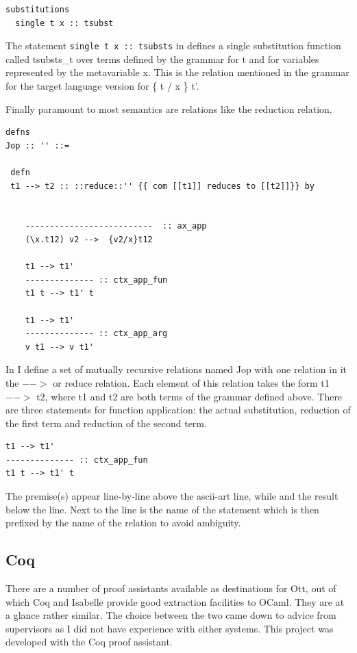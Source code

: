 \documentclass[12pt,twoside,notitlepage]{report}
\begin{document}
\begin{minipage}{\linewidth}
\begin{lstlisting}[language={Ott}, caption={Ott substitution example}, label={lst:ottsubstex}]
substitutions
  single t x :: tsubst 
\end{lstlisting}
\end{minipage}


The statement \lstinline[language={Ott}]|single t x :: tsubsts| in  defines a single substitution function called tsubsts\_t over terms defined by the grammar for t and for variables represented by the metavariable x. This is the relation mentioned in the grammar for the target language version for \{ t / x \} t'.



Finally paramount to most semantics are relations like the reduction relation.
\begin{lstlisting}[language={Ott}, caption={Ott reduction relation example}, label={lst:ottredex}]
defns
Jop :: '' ::=

 defn
 t1 --> t2 :: ::reduce::'' {{ com [[t1]] reduces to [[t2]]}} by


    --------------------------  :: ax_app
    (\x.t12) v2 -->  {v2/x}t12

    t1 --> t1'
    -------------- :: ctx_app_fun
    t1 t --> t1' t

    t1 --> t1'
    -------------- :: ctx_app_arg
    v t1 --> v t1'
\end{lstlisting}
In  I define a set of mutually recursive relations named Jop with one relation in it the $-->$ or reduce relation. Each element of this relation takes the form t1 $-->$ t2, where t1 and t2 are both terms of the grammar defined above. There are three statements for function application: the actual substitution, reduction of the first term and reduction of the second term. 
\begin{lstlisting}[language={Ott}, caption={Ott single reduction}]
t1 --> t1'
-------------- :: ctx_app_fun
t1 t --> t1' t
\end{lstlisting}
The premise(s) appear line-by-line above the ascii-art line, while and the result below the line. Next to the line is the name of the statement which is then prefixed by the name of the relation to avoid ambiguity. 



\subsection{Coq}
There are a number of proof assistants available as destinations for Ott, out of which Coq and Isabelle provide good extraction facilities to OCaml. They are at a glance rather similar. The choice between the two came down to advice from supervisors as I did not have experience with either systems. This project was developed with the Coq proof assistant. 
\end{document}
